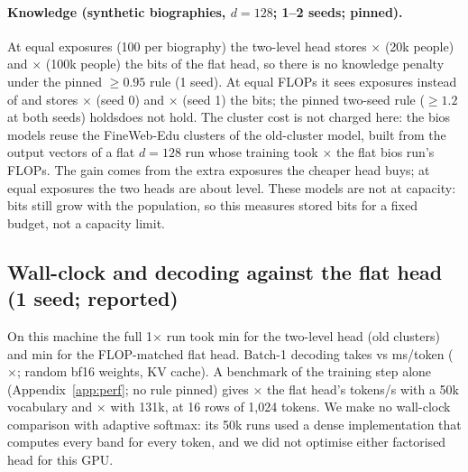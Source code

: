 \documentclass[11pt]{article}
\theoremstyle{remark}
\begin{document}
\paragraph{Knowledge (synthetic biographies, $d=128$; 1--2 seeds; pinned).} At equal exposures (100 per biography) the two-level
head stores \KnowRatioTwenty{}$\times$ (20k people) and \KnowRatioHundred{}$\times$ (100k people) the bits of the flat head, so
there is no knowledge penalty under the pinned $\ge 0.95$ rule (1 seed). At equal FLOPs it sees \ExpHEqF{} exposures instead of
\ExpBHundred{} and stores \DTwoRatioZero{}$\times$ (seed 0) and \DTwoRatioOne{}$\times$ (seed 1) the bits; the pinned
two-seed rule ($\ge 1.2$ at both seeds) \ifdtwo holds\else does not hold\fi. The cluster cost is not charged here: the
bios models reuse the FineWeb-Edu clusters of the old-cluster model, built from the output vectors of a flat $d=128$ run whose
training took \ClusterCostBios{}$\times$ the flat bios run's FLOPs. The gain comes from the extra exposures the cheaper head
buys; at equal exposures the two heads are about level. These models are not at capacity: bits still grow
with the population, so this measures stored bits for a fixed budget, not a capacity limit.

\subsection{Wall-clock and decoding against the flat head (1 seed; reported)}\label{sec:speed}
On this machine the full 1$\times$ run took \WallHsRow{} min for the two-level head (old clusters) and \WallBm{} min for the
FLOP-matched flat head. Batch-1 decoding takes \DecHs{} vs \DecB{} ms/token (\DecRatio{}$\times$; random bf16 weights,
KV cache). A benchmark of the training step alone (Appendix~\ref{app:perf}; no rule pinned) gives \PerfRatioFifty{}$\times$ the
flat head's tokens/s with a 50k vocabulary and \PerfRatioBig{}$\times$ with 131k, at 16 rows of 1,024 tokens. We make no
wall-clock comparison with adaptive softmax: its 50k runs used a dense implementation that computes every band for every
token, and we did not optimise either factorised head for this GPU.
\end{document}

